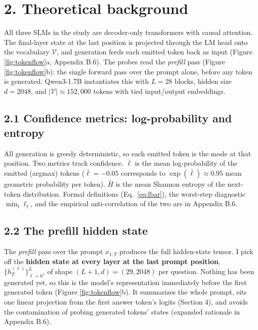 \section{2. Theoretical background}\label{theoretical-background}

All three SLMs in the study are decoder-only transformers with causal attention.
The final-layer state at the last position is projected through the
LM head onto the vocabulary \(\mathcal{V}\), and
generation feeds each emitted token back as input (Figure
\ref{fig:tokenflow}a, Appendix B.6). The probes read the \emph{prefill}
pass (Figure \ref{fig:tokenflow}b): the single forward pass over the
prompt alone, before any token is generated. Qwen3-1.7B instantiates
this with \(L = 28\) blocks, hidden size \(d = 2048\), and
\(|\mathcal{V}| \approx 152{,}000\) tokens with tied input/output
embeddings.

\subsection{2.1 Confidence metrics: log-probability and
entropy}\label{confidence-metrics-log-probability-and-entropy}

All generation is greedy deterministic, 
so each emitted token is the mode at that position. Two metrics track confidence.
\(\bar\ell\) is the mean
log-probability of the emitted (argmax) tokens (\(\bar\ell = -0.05\)
corresponds to \(\exp(\bar\ell)\approx 0.95\) mean geometric probability per token). \(\bar H\) is the mean
Shannon entropy of the next-token distribution.  
Formal definitions (Eq.~\eqref{eq:lbar}), the worst-step
diagnostic \(\min_t \ell_t\), and the empirical anti-correlation of the
two are in Appendix B.6.

\subsection{2.2 The prefill hidden state}\label{the-prefill-hidden-state-as-the-canonical-going-in-representation}

The \emph{prefill} pass over the prompt \(x_{1:T}\) produces the full
hidden-state tensor. I pick off the \textbf{hidden state at every layer
at the last prompt position}, \(\{h^{(\ell)}_T\}_{\ell=0}^{L}\), of
shape \((L+1, d) = (29, 2048)\) per question. Nothing has been generated
yet, so this is the model's representation immediately before the first generated token (Figure \ref{fig:tokenflow}b). It summarizes the
whole prompt, sits one linear projection from the first answer token's
logits (Section 4), and avoids the contamination of probing generated
tokens' states (expanded rationale in Appendix B.6).

